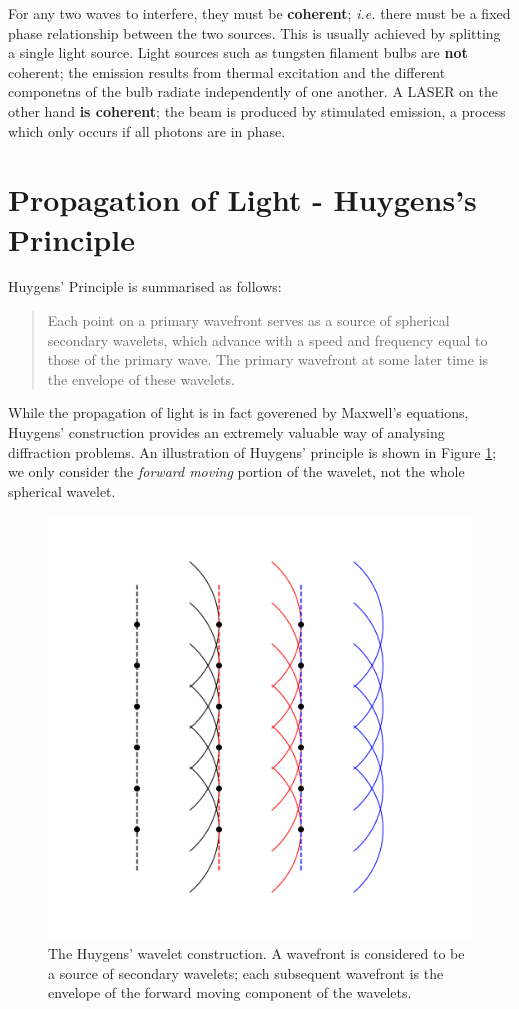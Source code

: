 \documentclass[
]{book}
\begin{document}
For any two waves to interfere, they must be \textbf{coherent}; \emph{i.e.} there must be a fixed phase relationship between the two sources. This is usually achieved by splitting a single light source. Light sources such as tungsten filament bulbs are \textbf{not} coherent; the emission results from thermal excitation and the different componetns of the bulb radiate independently of one another. A LASER on the other hand \textbf{is coherent}; the beam is produced by stimulated emission, a process which only occurs if all photons are in phase.

\hypertarget{sec:ch13-lightpropagation}{%
\section{Propagation of Light - Huygens's Principle}\label{sec:ch13-lightpropagation}}

Huygens' Principle is summarised as follows:

\begin{quote}
Each point on a primary wavefront serves as a source of spherical secondary wavelets, which advance with a speed and frequency equal to those of the primary wave. The primary wavefront at some later time is the envelope of these wavelets.
\end{quote}

While the propagation of light is in fact goverened by Maxwell's equations, Huygens' construction provides an extremely valuable way of analysing diffraction problems. An illustration of Huygens' principle is shown in Figure \ref{fig:ch13-huygenswavelets1}; we only consider the \emph{forward moving} portion of the wavelet, not the whole spherical wavelet.

\begin{figure}

{\centering \includegraphics[width=0.7\linewidth]{visualisations/ch13-huygenswavelets1} 

}

\caption{The Huygens' wavelet construction. A wavefront is considered to be a source of secondary wavelets; each subsequent wavefront is the envelope of the forward moving component of the wavelets.}\label{fig:ch13-huygenswavelets1}
\end{figure}
\end{document}
